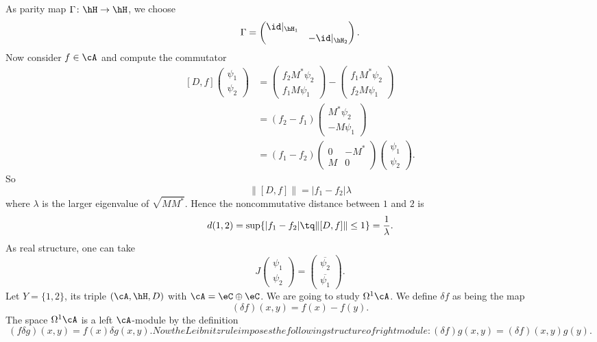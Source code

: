 As parity map $\Gamma\colon \hH\to \hH$, we choose
\[
	\Gamma=\begin{pmatrix}
		\id|_{\hH_1} \\ &-\id|_{\hH_2}
	\end{pmatrix}.
\]
Now consider $f\in\cA$ and compute the commutator
\[
	\begin{split}
		[D,f]\begin{pmatrix}
			\psi_1 \\\psi_2
		\end{pmatrix}
		&=
		\begin{pmatrix}
			f_2 M^*\psi_2 \\f_1M\psi_1
		\end{pmatrix}
		-
		\begin{pmatrix}
			f_1M^*\psi_2 \\f_2M\psi_1
		\end{pmatrix}\\
		&=(f_2-f_1)\begin{pmatrix}
			M^*\psi_2 \\-M\psi_1
		\end{pmatrix}\\
		&=(f_1-f_2)\begin{pmatrix}
			0 & -M^* \\M&0
		\end{pmatrix}
		\begin{pmatrix}
			\psi_1 \\\psi_2
		\end{pmatrix}.
	\end{split}
\]
So
\[
	\| [D,f] \|=| f_1-f_2 |\lambda
\]
where $\lambda$ is the larger eigenvalue of $\sqrt{MM^*}$. Hence the noncommutative distance between $1$ and $2$ is
\[
	d(1,2)=\sup\{ | f_1-f_2 |\tq \| [D,f] \|\leq 1 \}=\frac{1}{ \lambda }.
\]
As real structure, one can take
\[
	J\begin{pmatrix}
		\psi_1 \\\psi_2
	\end{pmatrix}=
	\begin{pmatrix}
		\overline{ \psi_2 } \\\overline{ \psi_1 }
	\end{pmatrix}.
\]
Let $Y=\{ 1,2 \}$, its triple $(\cA,\hH,D)$ with $\cA=\eC\oplus\eC$. We are going to study $\Omega^1\cA$. We define $\delta f$ as being the map
\begin{equation}
	(\delta f)(x,y)=f(x)-f(y).
\end{equation}
The space $\Omega^1\cA$ is a left $\cA$-module by the definition
\begin{subequations}
	\begin{equation}
		(f\delta g)(x,y)=f(x)\delta g(x,y).          \label{SubEqfdeltagxya}
	\end{equation}
	Now the Leibnitz rule imposes the following structure of right module:
	\begin{equation}
		(\delta f)g(x,y)=(\delta f)(x,y)g(y).   \label{SubEqfdeltagxyb}
	\end{equation}
\end{subequations}
